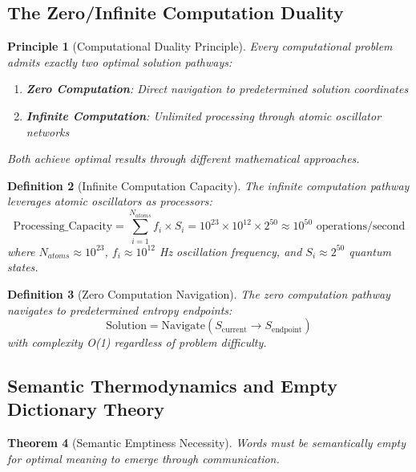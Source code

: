 \documentclass[12pt,a4paper]{article}
\newtheorem{theorem}{Theorem}[section]
\newtheorem{definition}[theorem]{Definition}
\newtheorem{principle}[theorem]{Principle}
\begin{document}
\subsection{The Zero/Infinite Computation Duality}

\begin{principle}[Computational Duality Principle]
Every computational problem admits exactly two optimal solution pathways:
\begin{enumerate}
\item \textbf{Zero Computation}: Direct navigation to predetermined solution coordinates
\item \textbf{Infinite Computation}: Unlimited processing through atomic oscillator networks
\end{enumerate}
Both achieve optimal results through different mathematical approaches.
\end{principle}

\begin{definition}[Infinite Computation Capacity]
The infinite computation pathway leverages atomic oscillators as processors:
\begin{equation}
\text{Processing\_Capacity} = \sum_{i=1}^{N_{atoms}} f_i \times S_i = 10^{23} \times 10^{12} \times 2^{50} \approx 10^{50} \text{ operations/second}
\end{equation}
where $N_{atoms} \approx 10^{23}$, $f_i \approx 10^{12}$ Hz oscillation frequency, and $S_i \approx 2^{50}$ quantum states.
\end{definition}

\begin{definition}[Zero Computation Navigation]
The zero computation pathway navigates to predetermined entropy endpoints:
\begin{equation}
\text{Solution} = \text{Navigate}(S_{\text{current}} \rightarrow S_{\text{endpoint}})
\end{equation}
with complexity O(1) regardless of problem difficulty.
\end{definition}

\subsection{Semantic Thermodynamics and Empty Dictionary Theory}

\begin{theorem}[Semantic Emptiness Necessity]
Words must be semantically empty for optimal meaning to emerge through communication.
\end{theorem}
\end{document}
